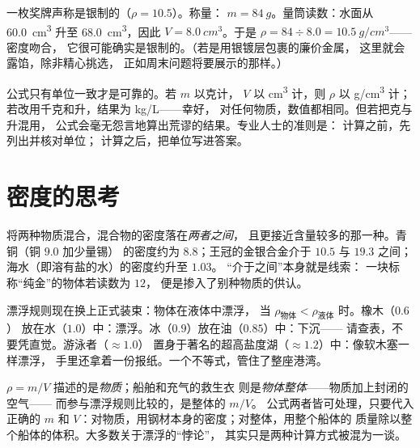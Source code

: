 \begin{example}\label{ex:g7:volume-mass-density:solid}
一枚奖牌声称是银制的（$\rho = 10.5$）。称量：
$m = \qty{84}{g}$。量筒读数：水面从 \qty{60.0}{cm^3} 升至
\qty{68.0}{cm^3}，因此 $V = \qty{8.0}{cm^3}$。于是
$\rho = 84 \div 8.0 = \qty{10.5}{g/cm^3}$——密度吻合，
它很可能确实是银制的。（若是用银镀层包裹的廉价金属，
这里就会露馅，除非精心挑选，
正如周末问题将要展示的那样。）
\end{example}

\begin{remark}[公式中的单位]\label{rem:g7:volume-mass-density:units}
公式只有单位一致才是可靠的。若 $m$ 以克计，
$V$ 以 \unit{cm^3} 计，则 $\rho$ 以 \unit{g/cm^3} 计；
若改用千克和升，结果为 \unit{kg/L}——幸好，
对任何物质，数值都相同。但若把克与升混用，
公式会毫无怨言地算出荒谬的结果。专业人士的准则是：
计算之前，先列出并核对单位；
计算之后，把单位写进答案。
\end{remark}

\section{密度的思考}

\begin{example}[合金与中间情形]\label{ex:g7:volume-mass-density:alloys}
将两种物质混合，混合物的密度落在\emph{两者之间}，
且更接近含量较多的那一种。青铜（铜 $9.0$ 加少量锡）
的密度约为 $8.8$；王冠的金银合金介于 $10.5$ 与 $19.3$ 之间；
海水（即溶有盐的水）的密度约升至 $1.03$。
“介于之间”本身就是线索：
一块标称“纯金”的物体若读数为 $12$，
便是掺入了别种物质的供认。
\end{example}

\begin{example}[密度决定漂浮的世界]\label{ex:g7:volume-mass-density:floating}
漂浮规则现在换上正式装束：物体在液体中漂浮，
当 $\rho_{\text{物体}} < \rho_{\text{液体}}$ 时。橡木（$0.6$）
放在水（$1.0$）中：漂浮。冰（$0.9$）放在油（$0.85$）中：下沉——
请查表，不要凭直觉。游泳者（$\approx 1.0$）
置身于著名的超高盐度湖（$\approx 1.2$）中：像软木塞一样漂浮，
手里还拿着一份报纸。一个不等式，管住了整座港湾。
\end{example}

\begin{remark}\label{rem:g7:volume-mass-density:parcel}
$\rho = m/V$ 描述的是\emph{物质}；船舶和充气的救生衣
则是\emph{物体整体}——物质加上封闭的空气——
而参与漂浮规则比较的，是整体的 $m/V$。
公式两者皆可处理，只要代入正确的 $m$ 和
$V$：对物质，用钢材本身的密度；对整体，用整个船体的
质量除以整个船体的体积。大多数关于漂浮的“悖论”，
其实只是两种计算方式被混为一谈。
\end{remark}

